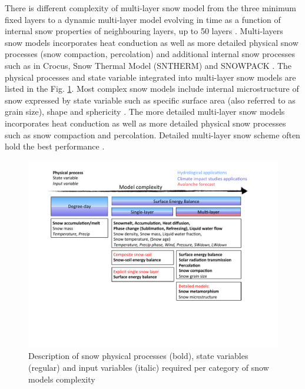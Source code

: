 \documentclass[hydrology,article,submit,moreauthors,pdftex]{Definitions/mdpi}
\begin{document}
There is different complexity of multi-layer snow model from the three minimum fixed layers \citep{Kondo_1990,Loth_1993,Sun_1999,Yang_2003,Wang_2013,Ekici_2014} to a dynamic multi-layer model evolving in time as a function of internal snow properties of neighbouring layers, up to 50 layers \citep{Brun_1992}. 
Multi-layers snow models incorporates heat conduction as well as more detailed physical snow processes (snow compaction, percolation) and additional internal snow processes such as in Crocus, Snow  Thermal  Model (SNTHERM) and SNOWPACK \citep{Brun_1989,Jordan_1991,Lehning_1999}. The physical processes and state variable integrated into multi-layer snow models are listed in the Fig. \ref{Fig:Model_complexity}. Most complex snow models include internal microstructure of snow expressed by state variable such as specific surface area (also referred to as grain size), shape and sphericity \citep{Lehning_2002,Vionnet_2012,Carmagnola_2014}. 
The more detailed multi-layer snow models incorporates heat conduction as well as more detailed physical snow processes such as snow compaction and percolation. %
Detailed multi-layer snow scheme often hold the best performance \citep{Krinner_2018}.

\begin{figure}
	\centering
	\includegraphics[scale=0.65]{Figures/Fig_modelcomplexity-Article-final}
	\caption{Description of snow physical processes (bold), state variables (regular) and input variables (italic) required per category of snow models complexity}\label{Fig:Model_complexity}
\end{figure}
\end{document}
